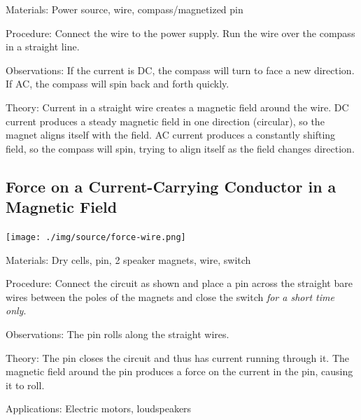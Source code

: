 \begin{multicols}{2}
\begin{description*}
\item[Materials:]{Power source, wire, compass/magnetized pin}
\item[Procedure:]{Connect the wire to the power supply. Run the wire over the compass in a straight line.}
\item[Observations:]{If the current is DC, the compass will turn to face a new direction. If AC, the compass will spin back and forth quickly.}
\item[Theory:]{Current in a straight wire creates a magnetic field around the wire. DC current produces a steady magnetic field in one direction (circular), so the magnet aligns itself with the field. AC current produces a constantly shifting field, so the compass will spin, trying to align itself as the field changes direction.}
\end{description*}

\subsection{Force on a Current-Carrying Conductor in a Magnetic Field}

\begin{center}
\texttt{[image: ./img/source/force-wire.png]}
\end{center}

\begin{description*}
\item[Materials:]{Dry cells, pin, 2 speaker magnets, wire, switch}
\item[Procedure:]{Connect the circuit as shown and place a pin across the straight bare wires between the poles of the magnets and close the switch \emph{for a short time only}.}
\item[Observations:]{The pin rolls along the straight wires.}
\item[Theory:]{The pin closes the circuit and thus has current running through it. The magnetic field around the pin produces a force on the current in the pin, causing it to roll.}
\item[Applications:]{Electric motors, loudspeakers}
\end{description*}


\end{multicols}

